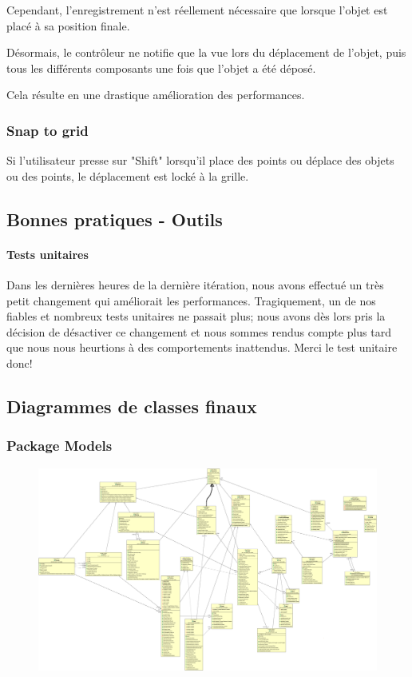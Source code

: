 	Cependant, l'enregistrement n'est réellement nécessaire que lorsque l'objet
	est placé à sa position finale.

	Désormais, le contrôleur ne notifie que la vue lors du déplacement de l'objet,
	puis tous les différents composants une fois que l'objet a été déposé.

	Cela résulte en une drastique amélioration des performances.

	\subsubsection{Snap to grid}
	Si l'utilisateur presse sur "Shift" lorsqu'il place des points ou déplace
	des objets ou des points, le déplacement est locké à la grille.

\subsection{Bonnes pratiques - Outils}

	\paragraph{Tests unitaires}
	Dans les dernières heures de la dernière itération, nous avons effectué un 
	très petit changement qui améliorait les performances. Tragiquement, un de nos
	fiables et nombreux tests unitaires ne passait plus; nous avons dès lors 
	pris la décision de désactiver ce changement et nous sommes rendus compte plus
	tard que nous nous heurtions à des comportements inattendus. Merci le test 
	unitaire donc!

\subsection{Diagrammes de classes finaux}

	\subsubsection{Package Models}
	\begin{figure}[!H]
		\center
		\includegraphics[width=\textwidth]{iteration4/fig/models-final-hand.png}
	\end{figure}

